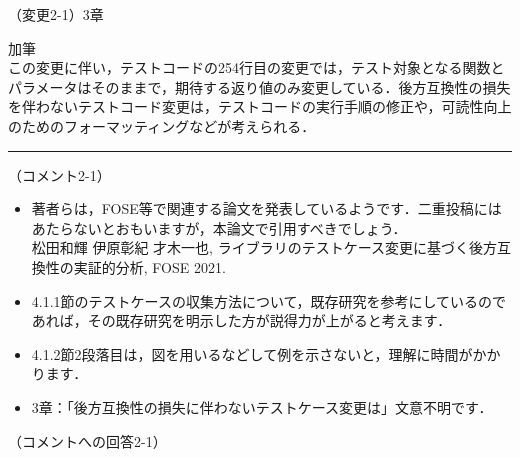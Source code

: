 \documentclass{jarticle} %
\def\subsection#1{ \vspace{1pc} {\gt #1} }
\def\nextans{ \vspace{2pc} \hrule }
\begin{document}
\subsection{（変更2-1）3章}
\vspace{-0.3cm}
\begin{description}
\item 加筆\\
\phantom{　}
この変更に伴い，テストコードの254行目の変更では，テスト対象となる関数とパラメータはそのままで，期待する返り値のみ変更している．\textcolor{red}{}後方互換性の損失を伴わないテストコード変更は，テストコードの実行手順の修正や，可読性向上のためのフォーマッティングなどが考えられる．
\end{description}


\newpage
\nextans
\subsection{（コメント2-1）}
\begin{itemize}
\item 著者らは，FOSE等で関連する論文を発表しているようです．二重投稿にはあたらないとおもいますが，本論文で引用すべきでしょう．\\
松田和輝 伊原彰紀 才木一也, ライブラリのテストケース変更に基づく後方互換性の実証的分析, FOSE 2021.
\item 4.1.1節のテストケースの収集方法について，既存研究を参考にしているのであれば，その既存研究を明示した方が説得力が上がると考えます．
\item 4.1.2節2段落目は，図を用いるなどして例を示さないと，理解に時間がかかります．
\item 3章：「後方互換性の損失に伴わないテストケース変更は」文意不明です．
\end{itemize}

\subsection{（コメントへの回答2-1）}
\end{document}
